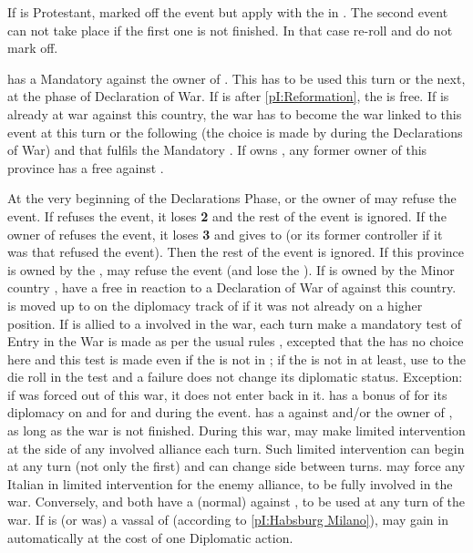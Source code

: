 \aparag If \FRA is Protestant, marked off the event but apply \RD with the
\REVOLT in \FRA.
\aparag The second event can not take place if the first one is not
finished. In that case re-roll and do not mark off.

\phevnt
\aparag \FRA has a Mandatory \CB against the owner of \provinceLombardia. This
\CB has to be used this turn or the next, at the phase of Declaration of
War. If \FRA is \CATHCR after \ref{pI:Reformation}, the \CB is free.
\aparag If \FRA is already at war against this country, the war has to become
the war linked to this event at this turn or the following (the choice is made
by \FRA during the Declarations of War) and that fulfils the Mandatory \CB.
\aparag If \FRA owns \provinceLombardia, any former owner of this province has
a free \CB against \FRA.

\phdipl
{}
\bparag At the very beginning of the Declarations Phase, \FRA or the owner of
\provinceLombardia may refuse the event.
\bparag If \FRA refuses the event, it loses {\bf 2} \STAB and the rest of the
event is ignored.
\bparag If the owner of \provinceLombardia refuses the event, it loses {\bf 3}
\STAB and gives \provinceLombardia to \FRA (or its former controller if it was
\FRA that refused the event). Then the rest of the event is ignored. If this
province is owned by the \HAB, \SPA may refuse the event (and lose the \STAB).
 If \provinceLombardia is owned by the Minor
country \paysMilan, \HAB have a free \CB in reaction to a Declaration of War
of \FRA against this country. \paysMilan is moved up to \EG on the diplomacy
track of \HAB if it was not already on a higher position.
 If \payspapaute is allied to a \MAJ involved
in the war, each turn make a mandatory test of Entry in the War is made as per
the usual rules , excepted that the \MAJ has no
choice here and this test is made even if the \MIN is not in \EG; if the
\paysPapaute is not in \EG at least, use  to the die roll in the
test and a failure does not change its diplomatic status. Exception: if
\payspapaute was forced out of this war, it does not enter back in it.
 \FRA has a bonus of  for its
diplomacy on \paysToscane and  for \payspapaute and \paysParme
during the event.
\bparag \VEN has a \CB against \FRA and/or the owner of \provinceLombardia, as
long as the war is not finished.
\bparag During this war, \VEN may make limited intervention at the side of any
involved alliance each turn. Such limited intervention can begin at any turn
(not only the first) and \VEN can change side between turns.  \VEN may force
any Italian \MIN in limited intervention for the enemy alliance, to be fully
involved in the war.
\bparag Conversely, \FRA and \HAB both have a (normal) \CB against \VEN, to be
used at any turn of the war.
 If \paysMilan is (or was) a vassal of \HAB
(according to \ref{pI:Habsburg Milano}), \HAB may gain \paysSuisse in \CE
automatically at the cost of one Diplomatic action.

